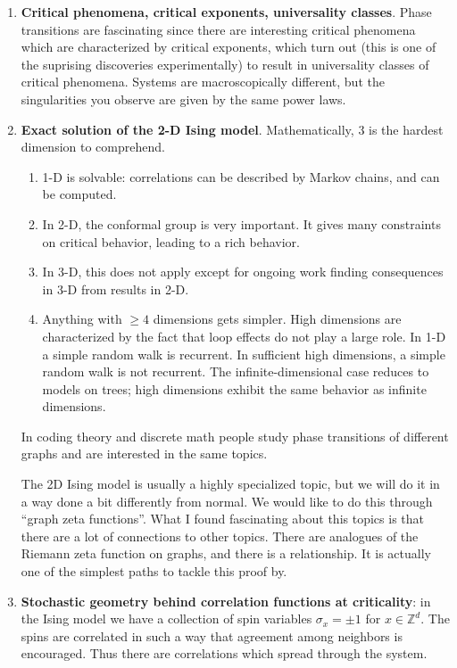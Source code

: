 \documentclass[12pt]{book}
\theoremstyle{norm}
\begin{document}
\begin{enumerate}
\item 
\textbf{Critical phenomena, critical exponents, universality classes}. Phase transitions are fascinating since there are interesting critical phenomena which are characterized by critical exponents, which turn out (this is one of the suprising discoveries experimentally) to result in universality classes of critical phenomena. Systems are macroscopically different, but the singularities you observe are given by the same power laws.
\item
\textbf{Exact solution of the 2-D Ising model}. %
Mathematically, 3 is the hardest dimension to comprehend.
\begin{enumerate}
\item
1-D is solvable: correlations can be described by Markov chains, and can be computed. 
\item
In 2-D, the conformal group is very important. It gives many constraints on critical behavior, leading to a rich behavior. 
\item
In 3-D, this does not apply except for ongoing work finding consequences in 3-D from results in 2-D. 
\item
Anything with $\ge 4$ dimensions gets simpler. High dimensions are characterized by the fact that loop effects do not play a large role. In 1-D a simple random walk is recurrent. In sufficient high dimensions, a simple random walk is not recurrent.
The infinite-dimensional case reduces to models on trees; high dimensions exhibit the same behavior as infinite dimensions.
\end{enumerate}
In coding theory and discrete math people study phase transitions of different graphs and are interested in the same topics.

The 2D Ising model is usually a highly specialized topic, but we will do it in a way done a bit differently from normal. We would like to do this through ``graph zeta functions''. What I found fascinating about this topics is that there are a lot of connections to other topics. There are analogues of the Riemann zeta function on graphs, and there is a relationship. It is actually one of the simplest paths to tackle this proof by. 

\item
\textbf{Stochastic geometry behind correlation functions at criticality}: in the Ising model we have a collection of spin variables $\sigma_x=\pm1$ for $x\in \mathbb{Z}^d$. The spins are correlated in such a way that agreement among neighbors is encouraged. Thus there are correlations which spread through the system. 


\end{enumerate}
\end{document}

